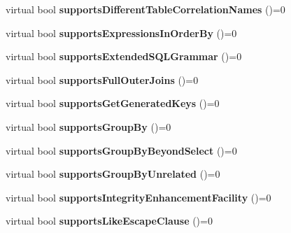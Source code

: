 \begin{DoxyCompactItemize}
virtual bool {\bfseries supports\+Different\+Table\+Correlation\+Names} ()=0
\item 
\hypertarget{classsql_1_1_database_meta_data_a48ee822065d1caeaffd694f34a902789}{}\label{classsql_1_1_database_meta_data_a48ee822065d1caeaffd694f34a902789} 
virtual bool {\bfseries supports\+Expressions\+In\+Order\+By} ()=0
\item 
\hypertarget{classsql_1_1_database_meta_data_a6dc4b1072c868a0e935711967b5fb01f}{}\label{classsql_1_1_database_meta_data_a6dc4b1072c868a0e935711967b5fb01f} 
virtual bool {\bfseries supports\+Extended\+S\+Q\+L\+Grammar} ()=0
\item 
\hypertarget{classsql_1_1_database_meta_data_a8f938da3105227952c3ae84f843d81ff}{}\label{classsql_1_1_database_meta_data_a8f938da3105227952c3ae84f843d81ff} 
virtual bool {\bfseries supports\+Full\+Outer\+Joins} ()=0
\item 
\hypertarget{classsql_1_1_database_meta_data_ab8b406cb6d1f9be7b4df619db3aac8d5}{}\label{classsql_1_1_database_meta_data_ab8b406cb6d1f9be7b4df619db3aac8d5} 
virtual bool {\bfseries supports\+Get\+Generated\+Keys} ()=0
\item 
\hypertarget{classsql_1_1_database_meta_data_ae56e6e899dde5e736b9ff302ac3cf8ea}{}\label{classsql_1_1_database_meta_data_ae56e6e899dde5e736b9ff302ac3cf8ea} 
virtual bool {\bfseries supports\+Group\+By} ()=0
\item 
\hypertarget{classsql_1_1_database_meta_data_ab82cd5565bda8aebd3f08af4f1062430}{}\label{classsql_1_1_database_meta_data_ab82cd5565bda8aebd3f08af4f1062430} 
virtual bool {\bfseries supports\+Group\+By\+Beyond\+Select} ()=0
\item 
\hypertarget{classsql_1_1_database_meta_data_a86d11d861fe907f7bb6bd18224843329}{}\label{classsql_1_1_database_meta_data_a86d11d861fe907f7bb6bd18224843329} 
virtual bool {\bfseries supports\+Group\+By\+Unrelated} ()=0
\item 
\hypertarget{classsql_1_1_database_meta_data_aedf724b78511a55fd166dc2a24ba049f}{}\label{classsql_1_1_database_meta_data_aedf724b78511a55fd166dc2a24ba049f} 
virtual bool {\bfseries supports\+Integrity\+Enhancement\+Facility} ()=0
\item 
\hypertarget{classsql_1_1_database_meta_data_afa66ae9c821e4cc646761829e244e88b}{}\label{classsql_1_1_database_meta_data_afa66ae9c821e4cc646761829e244e88b} 
virtual bool {\bfseries supports\+Like\+Escape\+Clause} ()=0
\item 
\hypertarget{classsql_1_1_database_meta_data_a51e12279f9730dc4d0c122e404c3e391}{}\label{classsql_1_1_database_meta_data_a51e12279f9730dc4d0c122e404c3e391} 

\end{DoxyCompactItemize}
